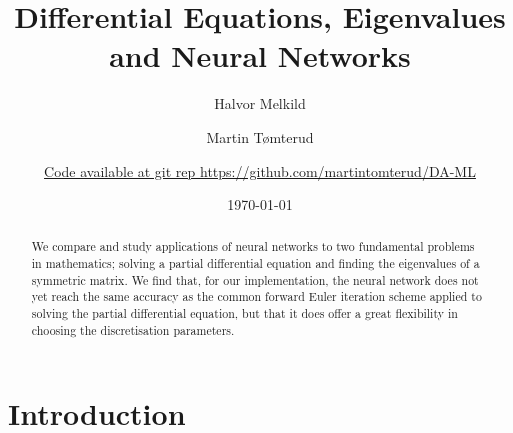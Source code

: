 \documentclass[a4paper, 
amsfonts, 
amssymb, 
amsmath, 
reprint, 
showkeys, 
nofootinbib, 
twoside]{revtex4-2}
\begin{document}
\title{ Differential Equations, Eigenvalues and Neural Networks}

\author{Halvor Melkild}

\author{Martin Tømterud}

\author{\textcolor{blue}{\href{https://github.com/martintomterud/DA-ML}{Code available at git rep https://github.com/martintomterud/DA-ML}}} 

\date{\today} 

\begin{abstract}
We compare and study applications of neural networks to two fundamental problems in mathematics; solving a partial differential equation and finding the eigenvalues of a symmetric matrix. We find that, for our implementation, the neural network does not yet reach the same accuracy as the common forward Euler iteration scheme applied to solving the partial differential equation, but that it does offer a great flexibility in choosing the discretisation parameters. 
\end{abstract}


\maketitle

\section{Introduction}
\end{document}
